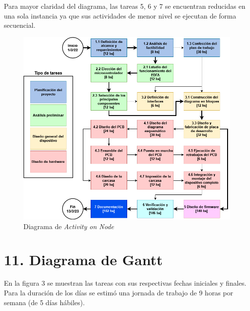 \documentclass[
11pt, %
]{charter}
\begin{document}
Para mayor claridad del diagrama, las tareas 5, 6 y 7 se encuentran reducidas en una sola instancia ya que sus actividades de menor nivel se ejecutan de forma secuencial.

\begin{figure}[H]
\centering 
\includegraphics[width=.9\textwidth]{./Figuras/AoN.png}
\caption{Diagrama de \textit{Activity on Node}}
\label{fig:AoN}
\end{figure}

\section{11. Diagrama de Gantt}
\label{sec:gantt}

En la figura 3 se muestran las tareas con sus respectivas fechas iniciales y finales. Para la duración de los días se estimó una jornada de trabajo de 9 horas por semana (de 5 días hábiles).
\end{document}

